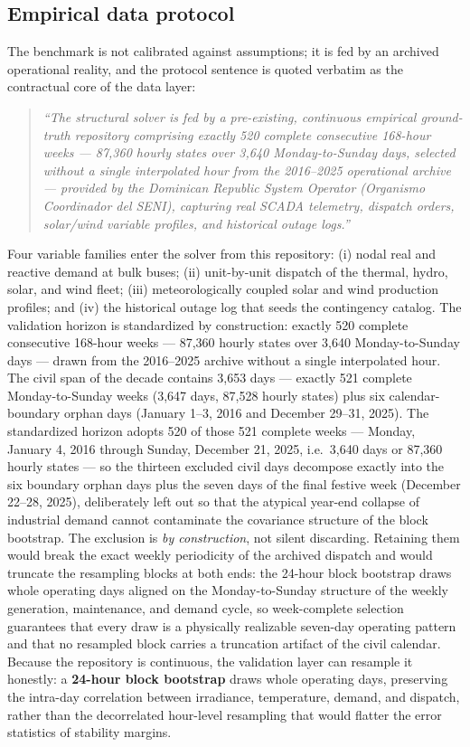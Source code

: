 \subsection{Empirical data protocol}
\label{sub:dataprotocol}

The benchmark is not calibrated against assumptions; it is fed by an archived operational reality, and the protocol sentence is quoted verbatim as the contractual core of the data layer:
\begin{quote}
\itshape ``The structural solver is fed by a pre-existing, continuous empirical ground-truth repository comprising exactly 520 complete consecutive 168-hour weeks --- 87,360 hourly states over 3,640 Monday-to-Sunday days, selected without a single interpolated hour from the 2016--2025 operational archive --- provided by the Dominican Republic System Operator (Organismo Coordinador del SENI), capturing real SCADA telemetry, dispatch orders, solar/wind variable profiles, and historical outage logs.''
\end{quote}

Four variable families enter the solver from this repository: (i) nodal real and reactive demand at bulk buses; (ii) unit-by-unit dispatch of the thermal, hydro, solar, and wind fleet; (iii) meteorologically coupled solar and wind production profiles; and (iv) the historical outage log that seeds the contingency catalog. The validation horizon is standardized by construction: exactly 520 complete consecutive 168-hour weeks --- 87,360 hourly states over 3,640 Monday-to-Sunday days --- drawn from the 2016--2025 archive without a single interpolated hour. The civil span of the decade contains 3,653 days --- exactly 521 complete Monday-to-Sunday weeks (3,647 days, 87,528 hourly states) plus six calendar-boundary orphan days (January 1--3, 2016 and December 29--31, 2025). The standardized horizon adopts 520 of those 521 complete weeks --- Monday, January 4, 2016 through Sunday, December 21, 2025, i.e.\ 3,640 days or 87,360 hourly states --- so the thirteen excluded civil days decompose exactly into the six boundary orphan days plus the seven days of the final festive week (December 22--28, 2025), deliberately left out so that the atypical year-end collapse of industrial demand cannot contaminate the covariance structure of the block bootstrap. The exclusion is \emph{by construction}, not silent discarding. Retaining them would break the exact weekly periodicity of the archived dispatch and would truncate the resampling blocks at both ends: the 24-hour block bootstrap draws whole operating days aligned on the Monday-to-Sunday structure of the weekly generation, maintenance, and demand cycle, so week-complete selection guarantees that every draw is a physically realizable seven-day operating pattern and that no resampled block carries a truncation artifact of the civil calendar. Because the repository is continuous, the validation layer can resample it honestly: a \textbf{24-hour block bootstrap} draws whole operating days, preserving the intra-day correlation between irradiance, temperature, demand, and dispatch, rather than the decorrelated hour-level resampling that would flatter the error statistics of stability margins.

